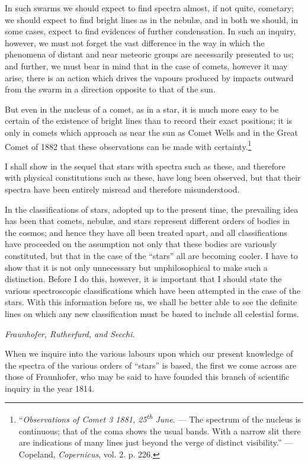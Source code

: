 \documentclass[a4paper, 12pt, oneside, polutonikogreek, english]{article}
\begin{document}
In such swarms we should expect to find spectra almost, if not quite, cometary; we should expect to find bright lines as in the nebulæ, and in both we should, in some cases, expect to find evidences of further condensation. In such an inquiry, however, we must not forget the vast difference in the way in which the phenomena of distant and near meteoric groups are necessarily presented to us; and further, we must bear in mind that in the case of comets, however it may arise, there is an action which drives the vapours produced by impacts outward from the swarm in a direction opposite to that of the sun.

But even in the nucleus of a comet, as in a star, it is much more easy to be certain of the existence of bright lines than to record their exact positions; it is only in comets which approach as near the sun as Comet Wells and in the Great Comet of 1882 that these observations can be made with certainty.\footnote{``\emph{Observations of Comet 3 1881, 25\textsuperscript{th} June.} --- The spectrum of the nucleus is continuous; that of the coma shows the usual bands. With a narrow slit there are indications of many lines just beyond the verge of distinct visibility.'' --- Copeland, \emph{Copernicus}, vol. 2. p. 226.}

I shall show in the sequel that stars with spectra such as these, and therefore with physical constitutions such as these, have long been observed, but that their spectra have been entirely misread and therefore misunderstood.

In the classifications of stars, adopted up to the present time, the prevailing idea has been that comets, nebulæ, and stars represent different orders of bodies in the cosmos; and hence they have all been treated apart, and all classifications have proceeded on the assumption not only that these bodies are variously constituted, but that in the case of the ``stars'' all are becoming cooler. I have to show that it is not only unnecessary but unphilosophical to make such a distinction. Before I do this, however, it is important that I should state the various spectroscopic classifications which have been attempted in the case of the stars. With this information before us, we shall be better able to see the definite lines on which any new classification must be based to include all celestial forms.

\emph{Fraunhofer, Rutherfurd, and Secchi.}

When we inquire into the various labours upon which our present knowledge of the spectra of the various orders of ``stars'' is based, the first we come across are those of Fraunhofer, who may be said to have founded this branch of scientific inquiry in the year 1814.
\end{document}
